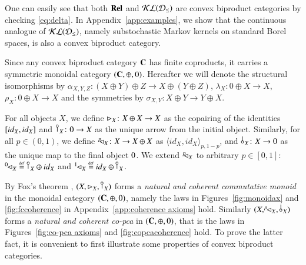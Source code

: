 One can easily see that both $\mathbf{Rel}$ and $\mathcal{KL}(\mathcal{D}_{\leq})$ are convex biproduct categories by checking \eqref{eq:delta}. In Appendix~\ref{app:examples}, we show that the continuous analogue of $\mathcal{KL}(\mathcal{D}_{\leq})$, namely substochastic Markov kernels on standard Borel spaces, is also a convex biproduct category.
%


\medskip

Since any convex biproduct category $\mathbf{C}$ has finite coproducts, it carries a symmetric monoidal category $(\mathbf{C}, \oplus, 0)$. Hereafter we will denote the structural isomorphisms by $\alpha_{X,Y,Z}\colon (X\oplus Y)\oplus Z \to X \oplus (Y \oplus Z)$, $\lambda_X\colon 0 \oplus X \to X$, $\rho_X \colon 0 \oplus X \to X$ and the symmetries by $\sigma_{X,Y}\colon X\oplus Y \to Y \oplus X$.

For all objects $X$, we define $\rhd_{X}\colon X \oplus X \to X$ as the copairing of the identities $[{id}_{X},{id}_{X}]$ and $\cobang{X} \colon 0 \to X$ as the unique arrow from the initial object. Similarly, 
 for all $p\in (0,1)$, we define  $^p\!\! \lhd_{X} \colon X \to X \oplus X$ as $\langle id_X, id_X \rangle_{p,1-p}$, and $\bang{X}\colon X \to \zero$ as the unique map to the final object $0$. We extend $^p\!\! \lhd_{X}$ to arbitrary $p\in [0,1]$: $\diagpX{0\;\;}{X}\defeq \cobang{X}\oplus \id{X}$ and $\diagpX{1\;\;}{X}\defeq \id{X} \oplus \cobang{X}$.

By Fox's theorem \cite{fox1976coalgebras}, $(X, \codiag{X}, \cobang{X})$ forms a \emph{natural and coherent commutative monoid} in the monoidal category  $(\mathbf{C}, \oplus, 0)$, namely the laws in Figures~\ref{fig:monoidax} and \ref{fig:fccoherence} in Appendix~\ref{app:coherence axioms} hold. Similarly $(X,\diagp{X}, \bang{X} )$ forms a \emph{natural and coherent co-pca} in $(\mathbf{C}, \oplus, 0)$, that is the laws in Figures~\ref{fig:co-pca axioms} and \ref{fig:copcacoherence} hold. To prove the latter fact, it is convenient to first illustrate some properties of convex biproduct categories.


